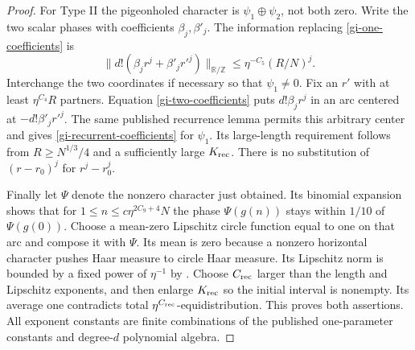 \begin{proof}
For Type II the pigeonholed character is $\psi_1\oplus\psi_2$, not both
zero.  Write the two scalar phases with coefficients $\beta_j,\beta'_j$.
The information replacing \eqref{gi-one-coefficients} is
\begin{equation}\label{gi-two-coefficients}
 \|d!(\beta_jr^j+\beta'_jr'^j)\|_{\mathbb R/\mathbb Z}
                        \leq\eta^{-C_5}(R/N)^j.
\end{equation}
Interchange the two coordinates if necessary so that $\psi_1\ne0$.
Fix an $r'$ with at least $\eta^{C_4}R$ partners.  Equation
\eqref{gi-two-coefficients} puts $d!\beta_jr^j$ in an arc centered at
$-d!\beta'_jr'^j$.  The same published recurrence lemma permits this
arbitrary center and gives \eqref{gi-recurrent-coefficients} for
$\psi_1$.  Its large-length requirement follows from
$R\geq N^{1/3}/4$ and a sufficiently large $K_{\rm rec}$.  There is no
substitution of $(r-r_0)^j$ for $r^j-r_0^j$.

Finally let $\Psi$ denote the nonzero character just obtained.  Its
binomial expansion shows that for
$1\leq n\leq c\eta^{2C_9+4}N$ the phase $\Psi(g(n))$ stays within
$1/10$ of $\Psi(g(0))$.  Choose a mean-zero Lipschitz circle function
equal to one on that arc and compose it with $\Psi$.  Its mean is zero
because a nonzero horizontal character pushes Haar measure to circle
Haar measure.  Its Lipschitz norm is bounded by a fixed power of
$\eta^{-1}$ by \cite[Appendix~A]{GTOrbits2012}.  Choose $C_{\rm rec}$
larger than the length and Lipschitz exponents, and then enlarge
$K_{\rm rec}$ so the initial interval is nonempty.  Its average one
contradicts total $\eta^{C_{\rm rec}}$-equidistribution.  This proves
both assertions.  All exponent constants are finite combinations of
the published one-parameter constants and degree-$d$ polynomial algebra.
\end{proof}

